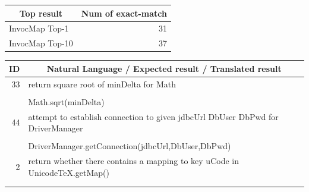\documentclass[sigconf,review,anonymous]{article}
\begin{document}
\begin{table}[]
\centering
\begin{tabular}{|l|r|}
\hline
\multicolumn{1}{|c|}{\textbf{Top result}} & \multicolumn{1}{c|}{\textbf{Num of exact-match}} \\ \hline
InvocMap Top-1                            & 31                                               \\ \hline
InvocMap Top-10                           & 37                                               \\ \hline
\end{tabular}
\end{table}

\begin{table}[]
\centering
\begin{tabular}{|l|l|}
\hline
\multicolumn{1}{|c|}{\textbf{ID}} & \multicolumn{1}{c|}{\textbf{Natural Language / Expected result / Translated result}}        \\ \hline
\multicolumn{1}{|r|}{33}          & return square root of minDelta for Math                                                     \\ \hline
\rowcolor[HTML]{DAE8FC} 
                                  & \cellcolor[HTML]{DAE8FC}                                                                    \\ \cline{1-1}
\rowcolor[HTML]{DAE8FC} 
                                  & \multirow{-2}{*}{\cellcolor[HTML]{DAE8FC}Math.sqrt(minDelta)}                               \\ \hline
\multicolumn{1}{|r|}{44}          & attempt to establish connection to given jdbcUrl DbUser DbPwd for DriverManager             \\ \hline
\rowcolor[HTML]{DAE8FC} 
                                  & \cellcolor[HTML]{DAE8FC}                                                                    \\ \cline{1-1}
\rowcolor[HTML]{DAE8FC} 
                                  & \multirow{-2}{*}{\cellcolor[HTML]{DAE8FC}DriverManager.getConnection(jdbcUrl,DbUser,DbPwd)} \\ \hline
\multicolumn{1}{|r|}{2}           & return whether there contains a mapping to key uCode in UnicodeTeX.getMap()                 \\ \hline
\rowcolor[HTML]{DAE8FC} 
                                  & \cellcolor[HTML]{DAE8FC}                                                                    \\ \cline{1-1}
\rowcolor[HTML]{DAE8FC} 

\end{tabular}
\end{table}
\end{document}
